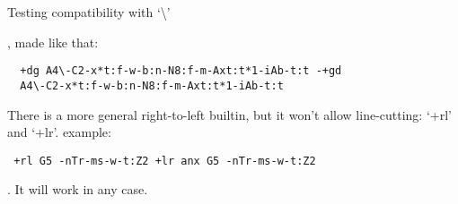 \documentclass[final]{article}
\begin{document}
Testing compatibility with `\textbackslash'
\begin{hieroglyph}{\leavevmode \rightleft\HwordSpace
{}\HinterSignsSpace
{}\HinterSignsSpace
{}\HinterSignsSpace
{}\HinterSignsSpace
{}\HinterSignsSpace
{}\HinterSignsSpace
{}\HinterSignsSpace
{}\HinterSignsSpace
{}\HinterSignsSpace
{}\HwordSpace
\leftright\HwordSpace
{}\HinterSignsSpace
{}\HinterSignsSpace
{}\HinterSignsSpace
{}\HinterSignsSpace
{}\HinterSignsSpace
{}\HinterSignsSpace
{}\HinterSignsSpace
{}\HinterSignsSpace
{}\HinterSignsSpace
{}}\end{hieroglyph}, made like that: 
\begin{verbatim}
  +dg A4\-C2-x*t:f-w-b:n-N8:f-m-Axt:t*1-iAb-t:t -+gd
  A4\-C2-x*t:f-w-b:n-N8:f-m-Axt:t*1-iAb-t:t
\end{verbatim}

There is a more general right-to-left builtin, but it won't allow
line-cutting: `+rl' and `+lr'. 
example:
\begin{verbatim}
 +rl G5 -nTr-ms-w-t:Z2 +lr anx G5 -nTr-ms-w-t:Z2 
\end{verbatim}
\begin{hieroglyph}{\leavevmode {}%
\HwordSpace
{}\HwordSpace
{}\HwordSpace
{}\HinterSignsSpace
{}\HinterSignsSpace
{}\HinterSignsSpace
{}}\end{hieroglyph}. It will work in any case.
\end{document}
